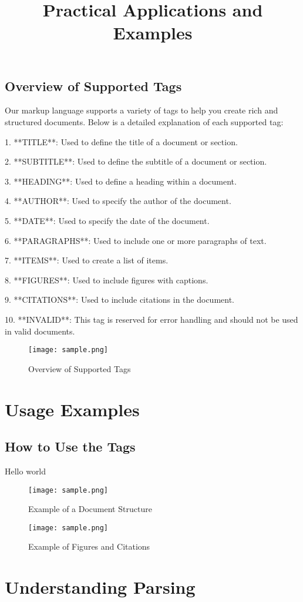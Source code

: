 \documentclass[oneside]{book}
\begin{document}
\section{Overview of Supported Tags}
Our markup language supports a variety of tags to help you create rich and structured documents. Below is a detailed explanation of each supported tag:\par
1. **TITLE**: Used to define the title of a document or section.\par
2. **SUBTITLE**: Used to define the subtitle of a document or section.\par
3. **HEADING**: Used to define a heading within a document.\par
4. **AUTHOR**: Used to specify the author of the document.\par
5. **DATE**: Used to specify the date of the document.\par
6. **PARAGRAPHS**: Used to include one or more paragraphs of text.\par
7. **ITEMS**: Used to create a list of items.\par
8. **FIGURES**: Used to include figures with captions.\par
9. **CITATIONS**: Used to include citations in the document.\par
10. **INVALID**: This tag is reserved for error handling and should not be used in valid documents.\par
\begin{figure}[h]
\centering
\texttt{[image: sample.png]}
\caption{Overview of Supported Tags}
\end{figure}
\newpage
\chapter{Usage Examples}
\section{How to Use the Tags}
\title{Practical Applications and Examples}
Hello world\par
\begin{figure}[h]
\centering
\texttt{[image: sample.png]}
\caption{Example of a Document Structure}
\texttt{[image: sample.png]}
\caption{Example of Figures and Citations}
\end{figure}
\newpage
\chapter{Understanding Parsing}
\end{document}
